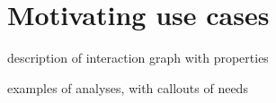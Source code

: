 \section{Motivating use cases}
\label{sec:cases}

description of interaction graph with properties

examples of analyses, with callouts of needs
